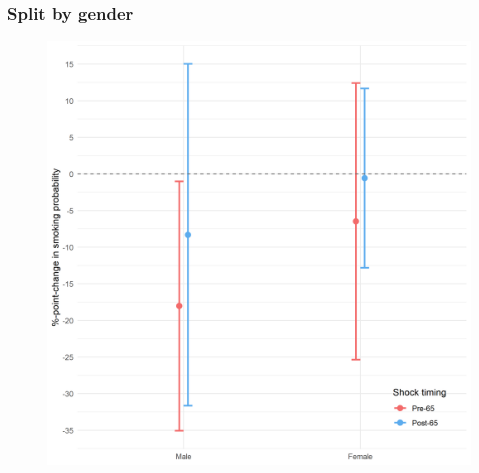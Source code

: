 \documentclass[10pt,compress,xcolor=dvipsnames,aspectratio=169]{beamer}    %
\newcounter{ex}
\newcommand{\1}[1]{\mathrm{1\hspace*{-2.5pt}l}[#1]}	%
\begin{document}
\begin{frame}
\frametitle{Split by gender}

\begin{figure}[hbtp]
\centering
\includegraphics[height=0.8\textheight]{../../3_output/shock_effects/female_6070_100_cv.png}
\label{fig:female}
\end{figure}
\hyperlink{frame:otherX}{}
\end{frame}
\end{document}
